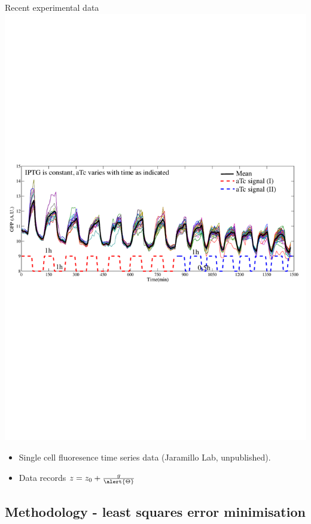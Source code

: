 \documentclass{beamer}
\begin{document}
\begin{frame}{Recent experimental data}{}
   \includegraphics[trim = 0 300 0 300,clip = true,scale = 0.55]{Figures/13_9}
  \begin{itemize}
    \item Single cell fluoresence time series data (Jaramillo Lab, unpublished).
    \item  Data records $z= z_{0} +\frac{g}{\alert{\Theta}} $
    \end{itemize}
\end{frame}


\subsection{Methodology - least squares error minimisation}
\end{document}
